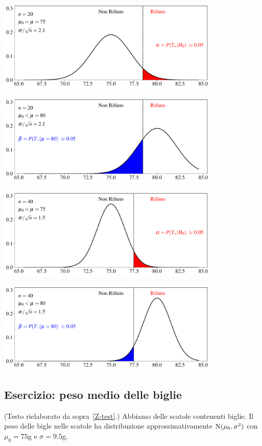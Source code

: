 \documentclass[11pt,openany]{book}
\begin{document}
\hfil\includegraphics[width=0.8\textwidth]{figure/Z-test_01.pdf}

\hfil\includegraphics[width=0.8\textwidth]{figure/Z-test_02.pdf}

\hfil\includegraphics[width=0.8\textwidth]{figure/Z-test_03.pdf}

\hfil\includegraphics[width=0.8\textwidth]{figure/Z-test_04.pdf}

\clearpage\subsection{Esercizio: peso medio delle biglie}
\label{Peso medio delle biglie: esercizio 1}

(Testo rielaborato da sopra~\ref{Z-test}.) 
Abbiamo delle scatole contenenti biglie.
Il peso delle bigle nelle scatole ha distribuzione approssimativamente  ${\rm N}(\mu_0,\sigma^2)$ con $\mu_0=75$g e $\sigma=9.5$g. 
\end{document}
